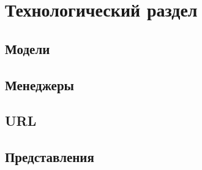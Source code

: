 \chapter{Технологический раздел}

\section{Модели}









\section{Менеджеры}





\section{URL}



\section{Представления}

